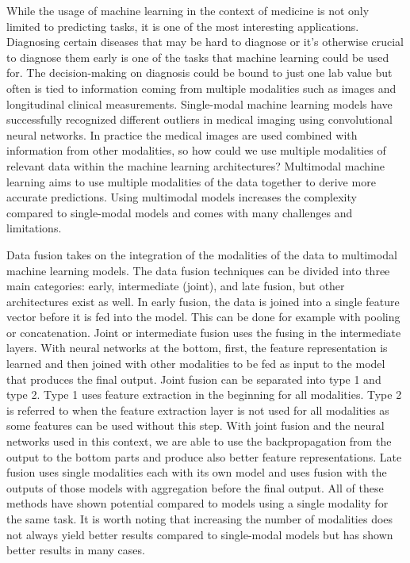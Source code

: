 While the usage of machine learning in the context of medicine is not only limited to predicting tasks, it is one of the most interesting applications. Diagnosing certain diseases that may be hard to diagnose or it's otherwise crucial to diagnose them early is one of the tasks that machine learning could be used for. The decision-making on diagnosis could be bound to just one lab value but often is tied to information coming from multiple modalities such as images and longitudinal clinical measurements. Single-modal machine learning models have successfully recognized different outliers in medical imaging using convolutional neural networks. In practice the medical images are used combined with information from other modalities, so how could we use multiple modalities of relevant data within the machine learning architectures? Multimodal machine learning aims to use multiple modalities of the data together to derive more accurate predictions. Using multimodal models increases the complexity compared to single-modal models and comes with many challenges and limitations. 

Data fusion takes on the integration of the modalities of the data to multimodal machine learning models. The data fusion techniques can be divided into three main categories: early, intermediate (joint), and late fusion, but other architectures exist as well.  In early fusion, the data is joined into a single feature vector before it is fed into the model. This can be done for example with pooling or concatenation.
Joint or intermediate fusion uses the fusing in the intermediate layers. With neural networks at the bottom, first, the feature representation is learned and then joined with other modalities to be fed as input to the model that produces the final output. Joint fusion can be separated into type 1 and type 2. Type 1 uses feature extraction in the beginning for all modalities. Type 2 is referred to when the feature extraction layer is not used for all modalities as some features can be used without this step. With joint fusion and the neural networks used in this context, we are able to use the backpropagation from the output to the bottom parts and produce also better feature representations. 
Late fusion uses single modalities each with its own model and uses fusion with the outputs of those models with aggregation before the final output. All of these methods have shown potential compared to models using a single modality for the same task. 
It is worth noting that increasing the number of modalities does not always yield better results compared to single-modal models but has shown better results in many cases.

